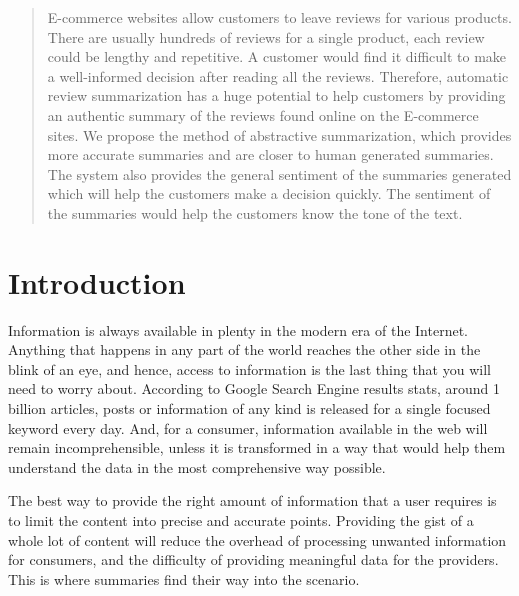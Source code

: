 \documentclass[11pt]{report}
\begin{document}
\begin{abstract}

E-commerce websites allow customers to leave reviews for various products. There are usually hundreds of reviews for a single product, each review could be lengthy and repetitive. A customer would find it difficult to make a well-informed decision after reading all the reviews. Therefore, automatic review summarization has a huge potential to help customers by providing an authentic summary of the reviews found online on the E-commerce sites. We propose the method of abstractive summarization, which provides more accurate summaries and are closer to human generated summaries. The system also provides the general sentiment of the summaries generated which will help the customers make a decision quickly. The sentiment of the summaries would help the customers know the tone of the text.
\end{abstract}

\tableofcontents

\cleardoublepage

\listoffigures

\cleardoublepage

\listoftables

\cleardoublepage

\newpage


\chapter{Introduction}
Information is always available in plenty in the modern era of the Internet. Anything that happens in any part of the world reaches the other side in the blink of an eye, and hence, access to information is the last thing that you will need to worry about. According to Google Search Engine results stats, around 1 billion articles, posts or information of any kind is released for a single focused keyword every day. And, for a consumer, information available in the web will remain incomprehensible, unless it is transformed in a way that would help them understand the data in the most comprehensive way possible.

The best way to provide the right amount of information that a user requires is to limit the content into precise and accurate points. Providing the gist of a whole lot of content will reduce the overhead of processing unwanted information for consumers, and the difficulty of providing meaningful data for the providers. This is where summaries find their way into the scenario.
\end{document}
